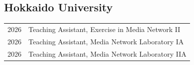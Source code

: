 
\subsection*{Hokkaido University}
%
\begin{longtable}[l]{@{}p{} p{}}

    2026 & Teaching Assistant, Exercise in Media Network II \\

    2026 & Teaching Assistant, Media Network Laboratory IA \\

    2026 & Teaching Assistant, Media Network Laboratory IIA \\

\end{longtable}
